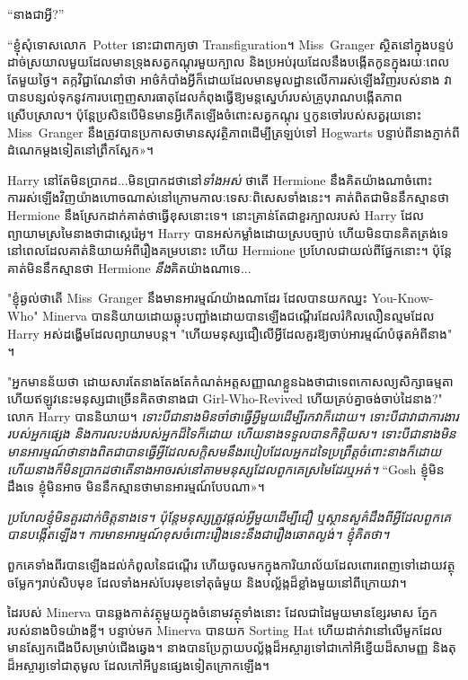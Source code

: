 “នាងជាអ្វី?”

“ខ្ញុំសុំទោសលោក~Potter នោះជាពាក្យថា Transfiguration។ Miss~Granger ស្ថិតនៅក្នុងបន្ទប់ដាច់ស្រយាលមួយដែលមានទ្រុងសត្វកណ្ដុរមួយក្បាល និងប្រអប់រុយដែលនឹងបង្កើតកូនក្នុងរយៈពេលតែមួយថ្ងៃ។ តក្កវិជ្ជា​ណែនាំ​ថា អាថ៌កំបាំង​អ្វី​ក៏ដោយ​ដែល​មាន​មូលដ្ឋាន​លើ​ការ​រស់ឡើងវិញ​របស់​នាង វា​បាន​បន្សល់​ទុក​នូវ​ការបញ្ចេញ​សារធាតុ​ដែល​កំពុង​ធ្វើឱ្យ​មន្តស្នេហ៍​របស់​គ្រូបុរាណ​បង្កើត​ភាព​ស្រើបស្រាល។ ប៉ុន្តែ​ប្រសិនបើ​មិនមាន​អ្វី​កើតឡើង​ចំពោះ​សត្វ​កណ្ដុរ ឬ​កូនចៅ​របស់​សត្វ​រុយ​នោះ Miss~Granger នឹង​ត្រូវ​បាន​ប្រកាស​ថា​មាន​សុវត្ថិភាព​ដើម្បី​ត្រឡប់​ទៅ Hogwarts បន្ទាប់ពី​នាង​ភ្ញាក់​ពី​ដំណេក​ម្តងទៀត​នៅ​ព្រឹក​ស្អែក​»​។

Harry នៅតែមិនប្រាកដ...មិនប្រាកដថានៅ\emph{ទាំងអស់} ថាតើ Hermione នឹងគិតយ៉ាងណាចំពោះការរស់ឡើងវិញយ៉ាងហោចណាស់នៅក្រោមកាលៈទេសៈពិសេសទាំងនេះ។ គាត់ពិតជាមិននឹកស្មានថា Hermione នឹងស្រែកដាក់គាត់ថាធ្វើខុសនោះទេ។ នោះគ្រាន់តែជាខួរក្បាលរបស់ Harry ដែលព្យាយាមស្រមៃនាងថាជាស្តេរ៉េអូ។ Harry បានអស់កម្លាំងដោយស្របច្បាប់ ហើយមិនបានគិតត្រង់ទេ នៅពេលដែលគាត់និយាយអំពីរឿងគម្របនោះ ហើយ Hermione ប្រហែលជាយល់ពីផ្នែកនោះ។ ប៉ុន្តែគាត់មិននឹកស្មានថា Hermione \emph{នឹង}គិតយ៉ាងណាទេ...

"ខ្ញុំឆ្ងល់ថាតើ Miss~Granger នឹងមានអារម្មណ៍យ៉ាងណាដែរ ដែលបានយកឈ្នះ You-Know-Who" Minerva បាននិយាយដោយឆ្លុះបញ្ជាំងដោយបានឡើងជណ្តើរដែលរំកិលលឿនល្មមដែល Harry អស់ដង្ហើមដែលព្យាយាមបន្ត។ "ហើយមនុស្សជឿលើអ្វីដែលគួរឱ្យចាប់អារម្មណ៍បំផុតអំពីនាង" ។

"អ្នកមានន័យថា ដោយសារតែនាងតែងតែកំណត់អត្តសញ្ញាណខ្លួនឯងថាជាទេពកោសល្យសិក្សាធម្មតា ហើយឥឡូវនេះមនុស្សជាច្រើនគិតថានាងជា Girl-Who-Revived ហើយគ្រប់គ្នាចង់ចាប់ដៃនាង?" លោក Harry បាននិយាយ។ \emph{ ទោះបីជានាងមិនចាំថាធ្វើអ្វីមួយដើម្បីរកវាក៏ដោយ។ ទោះបីជាវាជាការងាររបស់អ្នកផ្សេង និងការលះបង់របស់អ្នកដ៏ទៃក៏ដោយ ហើយនាងទទួលបានកិត្តិយស។ ទោះបីជានាងមិនមានអារម្មណ៍ថានាងពិតជាបានធ្វើអ្វីដែលសក្តិសមនឹងរបៀបដែលអ្នកដទៃប្រព្រឹត្តចំពោះនាងក៏ដោយ ហើយនាងក៏មិនប្រាកដថាតើនាងអាចរស់នៅតាមមនុស្សដែលពួកគេស្រមៃដែរឬអត់។} “Gosh ខ្ញុំមិនដឹងទេ ខ្ញុំមិនអាច មិន​នឹក​ស្មាន​ថា​មាន​អារម្មណ៍​បែប​ណា»។

\emph{ប្រហែលខ្ញុំមិនគួរដាក់ចិត្តនាងទេ។ ប៉ុន្តែមនុស្សត្រូវផ្តល់\emph{អ្វីមួយ}ដើម្បីជឿ ឬស្ថានសួគ៌ដឹងពីអ្វីដែលពួកគេបានបង្កើតឡើង។ ការ​មាន​អារម្មណ៍​ខុស​ចំពោះ​រឿង​នេះ​នឹង​ជា​រឿង​ឆោតល្ងង់។ ខ្ញុំគិតថា។ }

ពួកគេទាំងពីរបានឡើងដល់កំពូលនៃជណ្តើរ ហើយចូលមកក្នុងការិយាល័យដែលពោរពេញទៅដោយវត្ថុចម្លែកៗរាប់សិបមុខ ដែលទាំងអស់បែរមុខទៅតុធំមួយ និងបល្ល័ង្កដ៏ខ្លាំងមួយនៅពីក្រោយវា។

ដៃរបស់ Minerva បានឆ្លងកាត់វត្ថុមួយក្នុងចំនោមវត្ថុទាំងនោះ ដែលជាដៃមួយមានខ្សែរមាស ភ្នែករបស់នាងបិទយ៉ាងខ្លី។ បន្ទាប់មក Minerva បានយក Sorting Hat ហើយដាក់វានៅលើមួកដែលមានស្បែកជើងបីសម្រាប់ជើងឆ្វេង។ នាងបានប្រែក្លាយបល្ល័ង្កដ៏អស្ចារ្យទៅជាកៅអីខ្នើយដ៏សាមញ្ញ និងតុដ៏អស្ចារ្យទៅជាតុមូល ដែលកៅអីបួនផ្សេងទៀតក្រោកឡើង។

